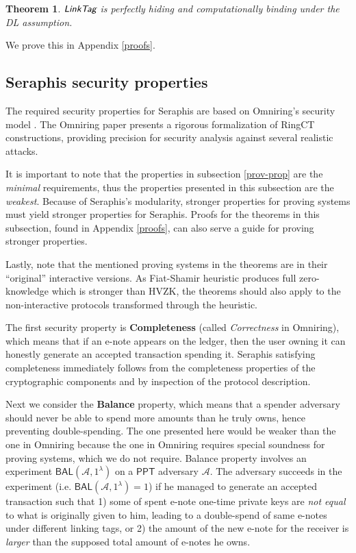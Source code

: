 \documentclass{article}
\newtheorem{theorem}{Theorem}[section]
\begin{document}
\begin{theorem}\label{thm-linktag}
$\emph{\textsf{LinkTag}}$ is perfectly hiding and computationally binding under the DL assumption.
\end{theorem}
\noindent We prove this in Appendix \ref{proofs}.

\subsection{Seraphis security properties}\label{sec-thm}
The required security properties for Seraphis are based on Omniring's security model \cite{omniring}. The Omniring paper presents a rigorous formalization of RingCT constructions, providing precision for security analysis against several realistic attacks.

It is important to note that the properties in subsection \ref{prov-prop} are the \textit{minimal} requirements, thus the properties presented in this subsection are the \textit{weakest}. Because of Seraphis's modularity, stronger properties for proving systems must yield stronger properties for Seraphis. Proofs for the theorems in this subsection, found in Appendix \ref{proofs}, can also serve a guide for proving stronger properties.

Lastly, note that the mentioned proving systems in the theorems are in their ``original'' interactive versions. As Fiat-Shamir heuristic produces full zero-knowledge which is stronger than HVZK, the theorems should also apply to the non-interactive protocols transformed through the heuristic.

The first security property is \textbf{Completeness} (called \textit{Correctness} in Omniring), which means that if an e-note appears on the ledger, then the user owning it can honestly generate an accepted transaction spending it. Seraphis satisfying completeness immediately follows from the completeness properties of the cryptographic components and by inspection of the protocol description.

Next we consider the \textbf{Balance} property, which means that a spender adversary should never be able to spend more amounts than he truly owns, hence preventing double-spending. The one presented here would be weaker than the one in Omniring because the one in Omniring requires special soundness for proving systems, which we do not require. Balance property involves an experiment $\textsf{BAL}(\mathcal{A}, 1^{\lambda})$  on a $\textsf{PPT}$ adversary $\mathcal{A}$. The adversary succeeds in the experiment (i.e. $\textsf{BAL}(\mathcal{A}, 1^{\lambda})=1$) if he managed to generate an accepted transaction such that 1) some of spent e-note one-time private keys are \textit{not equal} to what is originally given to him, leading to a double-spend of same e-notes under different linking tags, or 2) the amount of the new e-note for the receiver is \textit{larger} than the supposed total amount of e-notes he owns.
\end{document}
